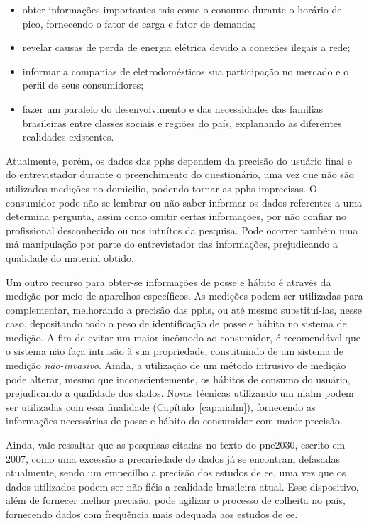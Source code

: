 \begin{itemize}
\item obter informações importantes tais como o consumo durante o horário de pico,
fornecendo o fator de carga e fator de demanda;
\item revelar causas de perda de energia elétrica devido a conexões ilegais a
rede;
\item informar a companias de eletrodomésticos sua participação no mercado e 
o perfil de seus consumidores;
\item fazer um paralelo do desenvolvimento e das necessidades das familias 
brasileiras entre classes sociais e regiões do país, explanando as 
diferentes realidades existentes.
\end{itemize}

Atualmente, porém, os dados das \glspl{pph} dependem da precisão do
usuário final e do entrevistador durante o preenchimento do
questionário, uma vez que não são utilizados medições no domicilio,
podendo tornar as \glspl{pph} imprecisas. O consumidor pode não se
lembrar ou não saber informar os dados referentes a uma determina
pergunta, assim como omitir certas informações, por não confiar no
profissional desconhecido ou nos intuítos da pesquisa.  Pode ocorrer
também uma má manipulação por parte do entrevistador das informações,
prejudicando a qualidade do material obtido.

Um outro recurso para obter-se informações de posse e hábito é através
da medição por meio de aparelhos específicos. As medições podem ser
utilizadas para complementar, melhorando a precisão das \glspl{pph},
ou até mesmo substituí-las, nesse caso, depositando todo o peso de
identificação de posse e hábito no sistema de medição. A fim de evitar
um maior incômodo ao consumidor, é recomendável que o sistema não faça
intrusão à sua propriedade, constituindo de um sistema de medição
\emph{não-invasivo}. Ainda, a utilização de um método intrusivo de
medição pode alterar, mesmo que inconscientemente, os hábitos de
consumo do usuário, prejudicando a qualidade dos dados.  Novas
técnicas utilizando um \gls{nialm} podem ser utilizadas com essa
finalidade (Capítulo~\ref{cap:nialm}), fornecendo as informações
necessárias de posse e hábito do consumidor com maior precisão. 

Ainda, vale ressaltar que as pesquisas citadas no texto do
\gls{pne2030}, escrito em 2007, como uma excessão a precariedade de
dados já se encontram defasadas atualmente, sendo um empecilho a
precisão dos estudos de \gls{ee}, uma vez que os dados utilizados
podem ser não fiéis a realidade brasileira atual.  Esse dispositivo,
além de fornecer melhor precisão, pode agilizar o processo de colheita
no país, fornecendo dados com frequência mais adequada aos estudos de
\gls{ee}. 
